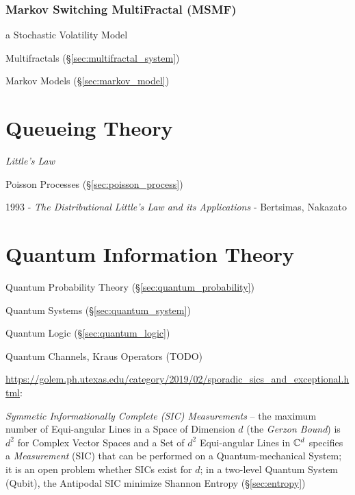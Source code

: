 \subsubsection{Markov Switching MultiFractal (MSMF)}\label{sec:msmf}


a Stochastic Volatility Model

\fist Multifractals (\S\ref{sec:multifractal_system})

\fist Markov Models (\S\ref{sec:markov_model})



\section{Queueing Theory}\label{sec:queueing_theory}

\emph{Little's Law}

Poisson Processes (\S\ref{sec:poisson_process})

1993 - \emph{The Distributional Little's Law and its Applications} - Bertsimas,
Nakazato



\section{Quantum Information Theory}\label{sec:quantum_information_theory}

Quantum Probability Theory (\S\ref{sec:quantum_probability})

Quantum Systems (\S\ref{sec:quantum_system})

Quantum Logic (\S\ref{sec:quantum_logic})

Quantum Channels, Kraus Operators (TODO)

\url{https://golem.ph.utexas.edu/category/2019/02/sporadic_sics_and_exceptional.html}:

\emph{Symmetic Informationally Complete (SIC) Measurements} -- the maximum
number of Equi-angular Lines in a Space of Dimension $d$ (the \emph{Gerzon
  Bound}) is $d^2$ for Complex Vector Spaces and a Set of $d^2$ Equi-angular
Lines in $\mathbb{C}^d$ specifies a \emph{Measurement} (SIC) that can be performed
on a Quantum-mechanical System;
it is an open problem whether SICs exist for $d$; in a two-level Quantum System
(Qubit), the Antipodal SIC minimize Shannon Entropy (\S\ref{sec:entropy})

